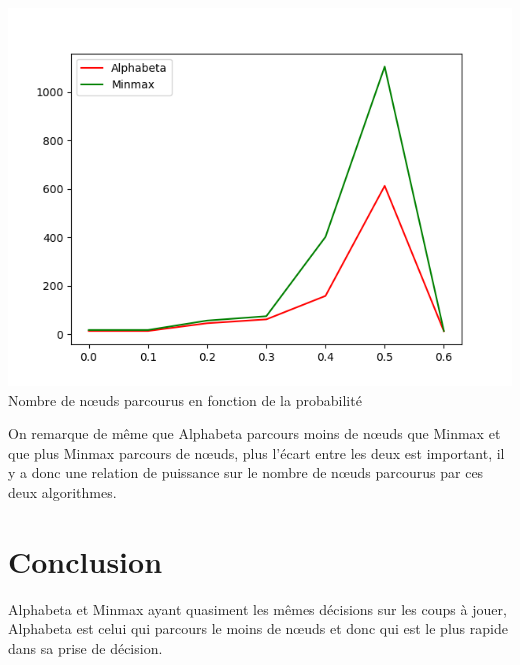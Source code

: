 \documentclass[a4paper,12pt]{article} %
\begin{document}
\begin{center}
\includegraphics[scale=0.5]{images/Figure_6.png}\\
Nombre de nœuds parcourus en fonction de la probabilité
\end{center}

On remarque de même que Alphabeta parcours moins de nœuds que Minmax et que plus Minmax parcours de nœuds, plus l'écart entre les deux est important, il y a donc une relation de puissance sur le nombre de nœuds parcourus par ces deux algorithmes.

\section*{Conclusion}

Alphabeta et Minmax ayant quasiment les mêmes décisions sur les coups à jouer, Alphabeta est celui qui parcours le moins de nœuds et donc qui est le plus rapide dans sa prise de décision.
\end{document}
